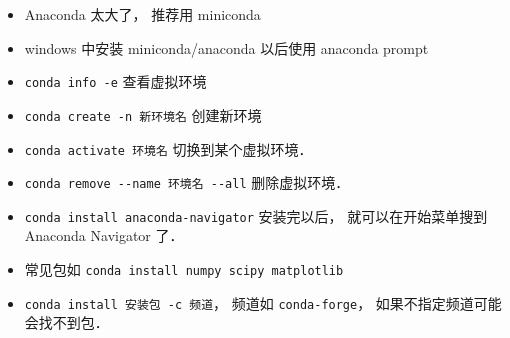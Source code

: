 
\begin{itemize}
\item Anaconda 太大了， 推荐用 miniconda
\item windows 中安装 miniconda/anaconda 以后使用 anaconda prompt
\item \verb|conda info -e| 查看虚拟环境
\item \verb|conda create -n 新环境名| 创建新环境
\item \verb|conda activate 环境名| 切换到某个虚拟环境．
\item \verb|conda remove --name 环境名 --all| 删除虚拟环境．
\item \verb|conda install anaconda-navigator| 安装完以后， 就可以在开始菜单搜到 Anaconda Navigator 了．
\item 常见包如 \verb|conda install numpy scipy matplotlib|
\item \verb|conda install 安装包 -c 频道|， 频道如 \verb|conda-forge|， 如果不指定频道可能会找不到包．
\end{itemize}
